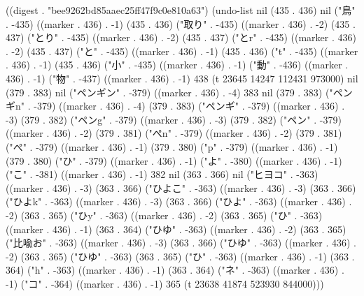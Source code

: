 
((digest . "bee9262bd85aaec25ff47f9c0e810a63") (undo-list nil (435 . 436) nil ("鳥" . -435) ((marker . 436) . -1) (435 . 436) ("取り" . -435) ((marker . 436) . -2) (435 . 437) ("とり" . -435) ((marker . 436) . -2) (435 . 437) ("とr" . -435) ((marker . 436) . -2) (435 . 437) ("と" . -435) ((marker . 436) . -1) (435 . 436) ("t" . -435) ((marker . 436) . -1) (435 . 436) ("小" . -435) ((marker . 436) . -1) ("動" . -436) ((marker . 436) . -1) ("物" . -437) ((marker . 436) . -1) 438 (t 23645 14247 112431 973000) nil (379 . 383) nil ("ペンギン" . -379) ((marker . 436) . -4) 383 nil (379 . 383) ("ペンギn" . -379) ((marker . 436) . -4) (379 . 383) ("ペンギ" . -379) ((marker . 436) . -3) (379 . 382) ("ペンg" . -379) ((marker . 436) . -3) (379 . 382) ("ペン" . -379) ((marker . 436) . -2) (379 . 381) ("ぺn" . -379) ((marker . 436) . -2) (379 . 381) ("ぺ" . -379) ((marker . 436) . -1) (379 . 380) ("p" . -379) ((marker . 436) . -1) (379 . 380) ("ひ" . -379) ((marker . 436) . -1) ("よ" . -380) ((marker . 436) . -1) ("こ" . -381) ((marker . 436) . -1) 382 nil (363 . 366) nil ("ヒヨコ" . -363) ((marker . 436) . -3) (363 . 366) ("ひよこ" . -363) ((marker . 436) . -3) (363 . 366) ("ひよk" . -363) ((marker . 436) . -3) (363 . 366) ("ひよ" . -363) ((marker . 436) . -2) (363 . 365) ("ひy" . -363) ((marker . 436) . -2) (363 . 365) ("ひ" . -363) ((marker . 436) . -1) (363 . 364) ("ひゆ" . -363) ((marker . 436) . -2) (363 . 365) ("比喩お" . -363) ((marker . 436) . -3) (363 . 366) ("ひゆ" . -363) ((marker . 436) . -2) (363 . 365) ("ひゆ" . -363) (363 . 365) ("ひ" . -363) ((marker . 436) . -1) (363 . 364) ("h" . -363) ((marker . 436) . -1) (363 . 364) ("ネ" . -363) ((marker . 436) . -1) ("コ" . -364) ((marker . 436) . -1) 365 (t 23638 41874 523930 844000)))
